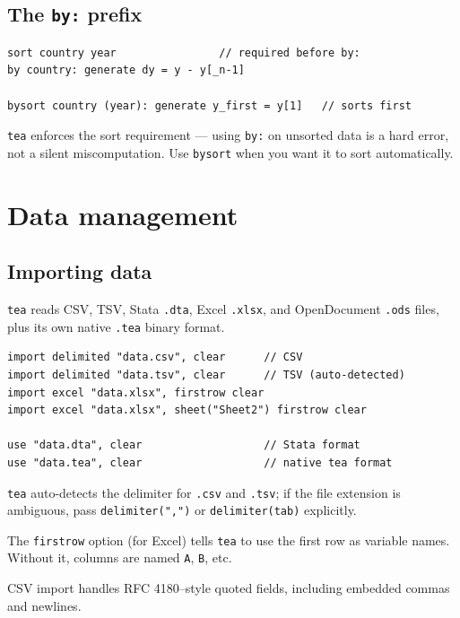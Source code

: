 \documentclass[11pt,letterpaper]{article}
\begin{document}
\subsection{The \texttt{by:} prefix}

\begin{lstlisting}
sort country year                // required before by:
by country: generate dy = y - y[_n-1]

bysort country (year): generate y_first = y[1]   // sorts first
\end{lstlisting}

\texttt{tea} enforces the sort requirement — using \texttt{by:} on
unsorted data is a hard error, not a silent miscomputation.  Use
\texttt{bysort} when you want it to sort automatically.

\section{Data management}

\subsection{Importing data}

\texttt{tea} reads CSV, TSV, Stata \texttt{.dta}, Excel \texttt{.xlsx},
and OpenDocument \texttt{.ods} files, plus its own native \texttt{.tea}
binary format.

\begin{lstlisting}
import delimited "data.csv", clear      // CSV
import delimited "data.tsv", clear      // TSV (auto-detected)
import excel "data.xlsx", firstrow clear
import excel "data.xlsx", sheet("Sheet2") firstrow clear

use "data.dta", clear                   // Stata format
use "data.tea", clear                   // native tea format
\end{lstlisting}

\texttt{tea} auto-detects the delimiter for \texttt{.csv} and
\texttt{.tsv}; if the file extension is ambiguous, pass
\texttt{delimiter(",")} or \texttt{delimiter(tab)} explicitly.

The \texttt{firstrow} option (for Excel) tells \texttt{tea} to use the
first row as variable names.  Without it, columns are named \texttt{A},
\texttt{B}, etc.

CSV import handles RFC 4180–style quoted fields, including embedded
commas and newlines.
\end{document}
